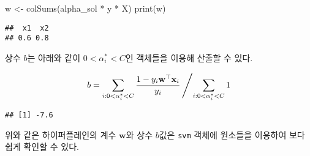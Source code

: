 \documentclass[
]{book}
\newenvironment{Shaded}{\begin{snugshade}}{\end{snugshade}}
\newcommand{\DecValTok}[1]{\textcolor[rgb]{0.00,0.00,0.81}{#1}}
\newcommand{\FunctionTok}[1]{\textcolor[rgb]{0.00,0.00,0.00}{#1}}
\newcommand{\NormalTok}[1]{#1}
\newcommand{\OtherTok}[1]{\textcolor[rgb]{0.56,0.35,0.01}{#1}}
\newcommand{\SpecialCharTok}[1]{\textcolor[rgb]{0.00,0.00,0.00}{#1}}
\begin{document}
\begin{Shaded}
\begin{Highlighting}[]
\NormalTok{w }\OtherTok{\textless{}{-}} \FunctionTok{colSums}\NormalTok{(alpha\_sol }\SpecialCharTok{*}\NormalTok{ y }\SpecialCharTok{*}\NormalTok{ X)}
\FunctionTok{print}\NormalTok{(w)}
\end{Highlighting}
\end{Shaded}

\begin{verbatim}
##  x1  x2 
## 0.6 0.8
\end{verbatim}

상수 \(b\)는 아래와 같이 \(0 < \alpha_{i}^{*} < C\)인 객체들을 이용해 산출할 수 있다.

\begin{equation*}
b = \sum_{i: 0 < \alpha_{i}^{*} < C} \frac{1 - y_{i} \mathbf{w}^{\top} \mathbf{x}_{i}}{y_{i}} \left/ \sum_{i: 0 < \alpha_{i}^{*} < C} 1 \right. 
\end{equation*}

\begin{Shaded}
\end{Shaded}

\begin{verbatim}
## [1] -7.6
\end{verbatim}

위와 같은 하이퍼플레인의 계수 \(\mathbf{w}\)와 상수 \(b\)값은 \texttt{svm} 객체에 원소들을 이용하여 보다 쉽게 확인할 수 있다.

\begin{Shaded}
\end{Shaded}
\end{document}
